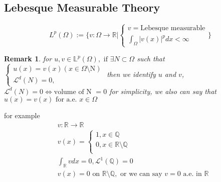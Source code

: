 \documentclass[a4paper,12pt]{article}
\newtheorem{remark}{Remark}[]
\newcommand{\R}{\mathbb{R}}
\newcommand{\Q}{\mathbb{Q}}
\newcommand{\Lspace}{\mathbb{L}}
\newcommand{\Lagr}{\mathcal{L}}
\begin{document}
\subsection{Lebesque Measurable Theory}
\begin{equation}
L^p(\Omega) := \Bigg\{v:\Omega \rightarrow \R|\begin{cases}
v = \text{Lebesque measurable}\\
\int_\Omega|v(x)|^p dx < \infty
\end{cases}\Bigg\}
\end{equation}
\begin{remark}
	for $u,v \in \Lspace^p(\Omega), \text{ if } \exists N \subset \Omega$
	such that $\begin{cases}
		u(x) = v(x) (x \in \Omega \setminus \text{N})\\
		\Lagr^d(N) = 0,
	\end{cases}$
	then we identify $u$ and $v$,
	$\Lagr^d(N) = 0 \Leftrightarrow \text{volume of N } = 0$
	for simplicity, we also can say that
	$u(x) = v(x) \text{ for a.e. } x \in \Omega$
\end{remark}
for example
\begin{equation}
\begin{aligned}
&v:\R \rightarrow \R\\
&v(x) = \begin{cases}
1, x \in \Q\\
0, x \in \R \setminus \Q\\
\end{cases}\\
&\int_\R v dx = 0, \Lagr^1(\Q) = 0\\
&v(x) = 0 \text{ on } \R \setminus \Q, \text{ or we can say } v = 0 \text{ a.e. in } \R
\end{aligned}
\end{equation}
\end{document}
